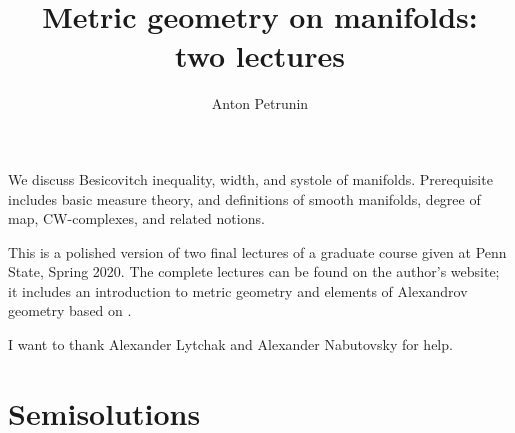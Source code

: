 \documentclass[twoside]{book}
\begin{document}
 
\title{Metric geometry on manifolds:
\\ two lectures}
\author{Anton Petrunin}
\date{}
\maketitle

We discuss Besicovitch inequality, width, and systole of manifolds.
Prerequisite includes  
basic measure theory, and
definitions of smooth manifolds,
degree of map, 
CW-complexes,
and related notions.

This is a polished version of two final lectures of a graduate course given at Penn State, Spring 2020.
The complete lectures can be found on the author's website;
it includes an introduction to metric geometry \cite{petrunin2020pure}
and elements of Alexandrov geometry based on \cite{alexander-kapovitch-petrunin-2019}.

I want to thank Alexander Lytchak and Alexander Nabutovsky for help.

\thispagestyle{empty}
\tableofcontents
\thispagestyle{empty}

%



%
%
%
\backmatter

\chapter{Semisolutions}
{

\footnotesize
\begin{multicols}{2}


\end{multicols}
}


{\small\sloppy


\def\emph{\textit}

\printbibliography[heading=bibintoc]
\fussy
}
\end{document}
